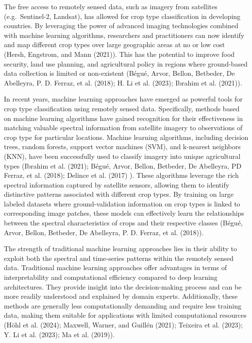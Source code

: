\documentclass[
]{article}
\begin{document}
The free access to remotely sensed data, such as imagery from satellites
(e.g.~Sentinel-2, Landsat), has allowed for crop type classification in
developing countries. By leveraging the power of advanced imaging
technologies combined with machine learning algorithms, researchers and
practitioners can now identify and map different crop types over large
geographic areas at no or low cost (Hersh, Engstrom, and Mann (2021)).
This has the potential to improve food security, land use planning, and
agricultural policy in regions where ground-based data collection is
limited or non-existent (Bégué, Arvor, Bellon, Betbeder, De Abelleyra,
P. D. Ferraz, et al. (2018); H. Li et al. (2023); Ibrahim et al.
(2021)).

In recent years, machine learning approaches have emerged as powerful
tools for crop type classification using remotely sensed data.
Specifically, methods based on machine learning algorithms have gained
recognition for their effectiveness in matching valuable spectral
information from satellite imagery to observations of crop type for
particular locations. Machine learning algorithms, including decision
trees, random forests, support vector machines (SVM), and k-nearest
neighbors (KNN), have been successfully used to classify imagery into
unique agricultural types (Ibrahim et al. (2021); Bégué, Arvor, Bellon,
Betbeder, De Abelleyra, PD Ferraz, et al. (2018); Delince et al. (2017)
). These algorithms leverage the rich spectral information captured by
satellite sensors, allowing them to identify distinctive patterns
associated with different crop types. By training on large labeled
datasets where ground-validation information on crop types is linked to
corresponding image patches, these models can effectively learn the
relationships between the spectral characteristics of crops and their
respective classes (Bégué, Arvor, Bellon, Betbeder, De Abelleyra, P. D.
Ferraz, et al. (2018)).

The strength of traditional machine learning approaches lies in their
ability to exploit both the spectral and time-series patterns within the
remotely sensed data. Traditional machine learning approaches offer
advantages in terms of interpretability and computational efficiency
compared to deep learning architectures. They provide insight into the
decision-making process and can be more readily understood and explained
by domain experts. Additionally, these methods are generally less
computationally demanding and require less training data, making them
suitable for applications with limited computational resources (Höhl et
al. (2024); Maxwell, Warner, and Guillén (2021); Teixeira et al. (2023);
Y. Li et al. (2023); Ma et al. (2019)).
\end{document}
